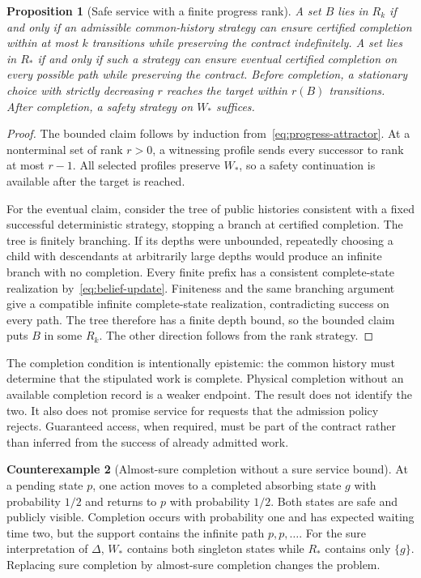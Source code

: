 \documentclass[11pt,letterpaper]{article}
\theoremstyle{plain}
\newtheorem{proposition}{Proposition}[section]
\theoremstyle{definition}
\newtheorem{counterexample}[proposition]{Counterexample}
\theoremstyle{remark}
\begin{document}
\begin{proposition}[Safe service with a finite progress rank]\label{prop:joint-progress}
A set $B$ lies in $R_k$ if and only if an admissible common-history strategy can ensure certified completion within at most $k$ transitions while preserving the contract indefinitely. A set lies in $R_*$ if and only if such a strategy can ensure eventual certified completion on every possible path while preserving the contract. Before completion, a stationary choice with strictly decreasing $r$ reaches the target within $r(B)$ transitions. After completion, a safety strategy on $W_*$ suffices.
\end{proposition}
\begin{proof}
The bounded claim follows by induction from~\eqref{eq:progress-attractor}. At a nonterminal set of rank $r>0$, a witnessing profile sends every successor to rank at most $r-1$. All selected profiles preserve $W_*$, so a safety continuation is available after the target is reached.

For the eventual claim, consider the tree of public histories consistent with a fixed successful deterministic strategy, stopping a branch at certified completion. The tree is finitely branching. If its depths were unbounded, repeatedly choosing a child with descendants at arbitrarily large depths would produce an infinite branch with no completion. Every finite prefix has a consistent complete-state realization by~\eqref{eq:belief-update}. Finiteness and the same branching argument give a compatible infinite complete-state realization, contradicting success on every path. The tree therefore has a finite depth bound, so the bounded claim puts $B$ in some $R_k$. The other direction follows from the rank strategy.
\end{proof}

The completion condition is intentionally epistemic: the common history must determine that the stipulated work is complete. Physical completion without an available completion record is a weaker endpoint. The result does not identify the two. It also does not promise service for requests that the admission policy rejects. Guaranteed access, when required, must be part of the contract rather than inferred from the success of already admitted work.

\begin{counterexample}[Almost-sure completion without a sure service bound]\label{ex:sure-service}
At a pending state $p$, one action moves to a completed absorbing state $g$ with probability $1/2$ and returns to $p$ with probability $1/2$. Both states are safe and publicly visible. Completion occurs with probability one and has expected waiting time two, but the support contains the infinite path $p,p,\ldots$. For the sure interpretation of $\Delta$, $W_*$ contains both singleton states while $R_*$ contains only $\{g\}$. Replacing sure completion by almost-sure completion changes the problem.
\end{counterexample}
\end{document}
